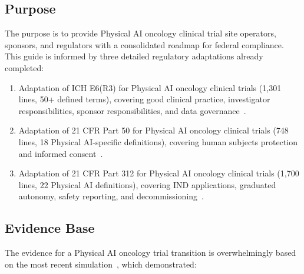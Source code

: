 \documentclass[11pt,letterpaper]{article}
\begin{document}
\subsection{Purpose}

The purpose is to provide Physical AI oncology clinical trial site operators,
sponsors, and regulators with a consolidated roadmap for federal compliance.
This guide is informed by three detailed regulatory adaptations already
completed:

\begin{enumerate}[label=(\arabic*)]
\item Adaptation of ICH E6(R3) for Physical AI oncology clinical trials
  (1,301 lines, 50+ defined terms), covering good clinical practice,
  investigator responsibilities, sponsor responsibilities, and data
  governance~\cite{iche6r3adapt}.
\item Adaptation of 21 CFR Part 50 for Physical AI oncology clinical trials
  (748 lines, 18 Physical AI-specific definitions), covering human subjects
  protection and informed consent~\cite{cfr50adapt}.
\item Adaptation of 21 CFR Part 312 for Physical AI oncology clinical trials
  (1,700 lines, 22 Physical AI definitions), covering IND applications,
  graduated autonomy, safety reporting, and
  decommissioning~\cite{cfr312adapt}.
\end{enumerate}

\subsection{Evidence Base}

The evidence for a Physical AI oncology trial transition is overwhelmingly
based on the most recent simulation~\cite{newtrial2026}, which demonstrated:
\end{document}
